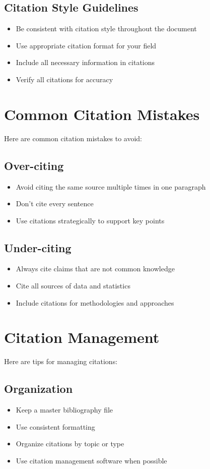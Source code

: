 \documentclass{article}
\begin{document}
\subsection{Citation Style Guidelines}
\begin{itemize}
    \item Be consistent with citation style throughout the document
    \item Use appropriate citation format for your field
    \item Include all necessary information in citations
    \item Verify all citations for accuracy
\end{itemize}

\section{Common Citation Mistakes}
Here are common citation mistakes to avoid:

\subsection{Over-citing}
\begin{itemize}
    \item Avoid citing the same source multiple times in one paragraph
    \item Don't cite every sentence
    \item Use citations strategically to support key points
\end{itemize}

\subsection{Under-citing}
\begin{itemize}
    \item Always cite claims that are not common knowledge
    \item Cite all sources of data and statistics
    \item Include citations for methodologies and approaches
\end{itemize}

\section{Citation Management}
Here are tips for managing citations:

\subsection{Organization}
\begin{itemize}
    \item Keep a master bibliography file
    \item Use consistent formatting
    \item Organize citations by topic or type
    \item Use citation management software when possible
\end{itemize}
\end{document}
